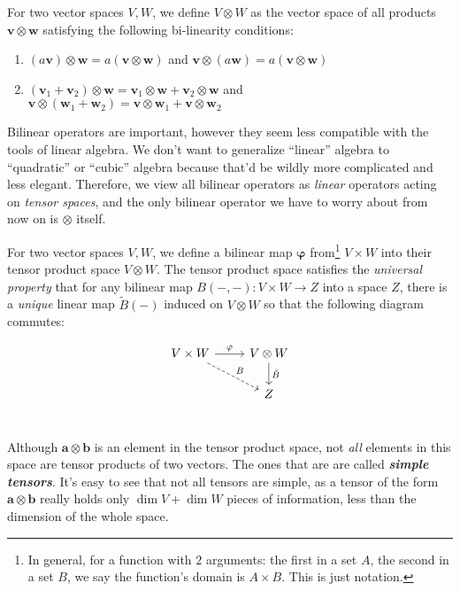 	\begin{defn}
		For two vector spaces $V,W$, we define $V \otimes W$ as the vector space of all products $\mathbf v \otimes \mathbf w$ satisfying the following bi-linearity conditions:
		\begin{enumerate}
			\item $(a \mathbf v) \otimes \mathbf w = a (\mathbf v \otimes \mathbf w)$ and $\mathbf v \otimes (a \mathbf w) = a (\mathbf v \otimes \mathbf w)$
			\item $(\mathbf v_1 + \mathbf v_2) \otimes \mathbf w = \mathbf v_1 \otimes \mathbf w + \mathbf v_2 \otimes \mathbf w$ and\\ $\mathbf v\otimes (\mathbf w_1 + \mathbf w_2) = \mathbf v \otimes \mathbf w_1 + \mathbf v \otimes \mathbf w_2$
		\end{enumerate}
	\end{defn}
	
	Bilinear operators are important, however they seem less compatible with the tools of linear algebra. We don't want to generalize ``linear'' algebra to ``quadratic'' or ``cubic'' algebra because that'd be wildly more complicated and less elegant. Therefore, we view all bilinear operators as \emph{linear} operators acting on \emph{tensor spaces}, and the only bilinear operator we have to worry about from now on is $\otimes$ itself. 

	
	\begin{defn}
		For two vector spaces $V,W$, we define a bilinear map $\mathbf \varphi$ from\footnote{In general, for a function with $2$ arguments: the first in a set $A$, the second in a set $B$, we say the function's domain is $A\times B$. This is just notation.} $V \times W$ into their tensor product space $V \otimes W$. The tensor product space satisfies the \emph{universal property} that for any bilinear map $B(-,-): V \times W \rightarrow Z$ into a space $Z$, there is a \emph{unique} linear map $\tilde B(-)$ induced on $V \otimes W$ so that the following diagram commutes:
		
		\[ 
		\begin{tikzcd}
		V \times W \arrow{r}{\varphi} \arrow[dashrightarrow]{rd}{B} & V \otimes W \arrow{d}{\tilde B} \\
		  & Z \\
		\end{tikzcd}
		\]
		
	\end{defn}
	\begin{nb}
		Although $\mathbf a \otimes \mathbf b$ is an element in the tensor product space, not \emph{all} elements in this space are tensor products of two vectors. The ones that are are called \emph{\textbf{simple tensors}}. It's easy to see that not all tensors are simple, as a tensor of the form $\mathbf a \otimes \mathbf b$ really holds only $\dim V + \dim W$ pieces of information, less than the dimension of the whole space.
	\end{nb}
	
